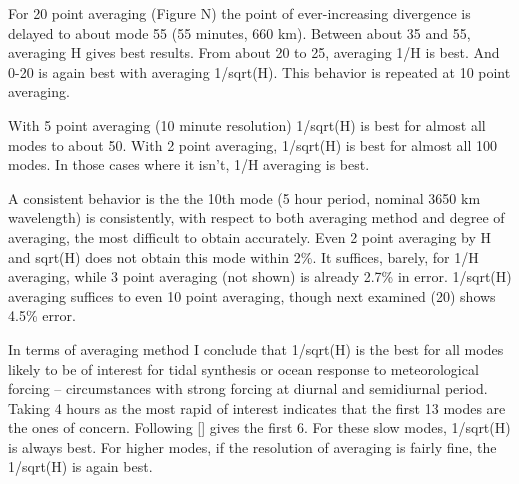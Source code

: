   For 20 point averaging (Figure N) the point of ever-increasing divergence 
is delayed to about mode 55 (55 minutes, 660 km).  Between about 35 and
55, averaging H gives best results.  From about 20 to 25, averaging 1/H is
best.  And 0-20 is again best with averaging 1/sqrt(H).  This behavior is
repeated at 10 point averaging.  

  With 5 point averaging (10 minute resolution) 1/sqrt(H) is best for
almost all modes to about 50.  With 2 point averaging, 1/sqrt(H) is best
for almost all 100 modes.  In those cases where it isn't, 1/H averaging 
is best.

  A consistent behavior is the the 10th mode (5 hour period, nominal 
3650 km wavelength) is consistently, with respect to both averaging 
method and degree of averaging, the most difficult to obtain accurately.
Even 2 point averaging by H and sqrt(H) does not obtain this mode within
2\%.  It suffices, barely, for 1/H averaging, while 3 point averaging
(not shown) is already 2.7\% in error.  1/sqrt(H) averaging suffices
to even 10 point averaging, though next examined (20) shows 4.5\% error.



  In terms of averaging method I conclude that 1/sqrt(H) is the best
for all modes likely to be of interest for tidal synthesis or 
ocean response to meteorological forcing -- circumstances with strong
forcing at diurnal and semidiurnal period.  Taking 4 hours as the most
rapid of interest indicates that the first 13 modes are the ones of
concern.  Following [] gives the first 6.  For these slow modes, 1/sqrt(H)
is always best.  For higher modes, if the resolution of averaging is
fairly fine, the 1/sqrt(H) is again best.

